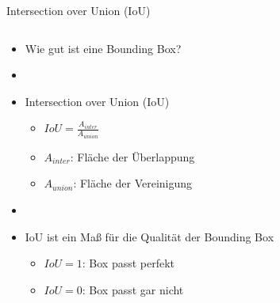 \documentclass{beamer}
\begin{document}
\begin{frame}{Intersection over Union (IoU)}
    \begin{columns}
        \begin{column}{0.6\textwidth}
            \begin{itemize}
                \item Wie gut ist eine Bounding Box?
                \item[]
                \item<2-> Intersection over Union (IoU)
                      \begin{itemize}
                          \item $IoU = \frac{A_{inter}}{A_{union}}$
                          \item $A_{inter}$: Fläche der Überlappung
                          \item $A_{union}$: Fläche der Vereinigung
                      \end{itemize}
                \item<2->[]
                \item<3-> IoU ist ein Maß für die Qualität der Bounding Box
                      \begin{itemize}
                          \item $IoU = 1$: Box passt perfekt
                          \item $IoU = 0$: Box passt gar nicht
                      \end{itemize}
            \end{itemize}
        \end{column}

        \begin{column}{0.4\textwidth}
            \begin{figure}
                \centering
            \end{figure}
        \end{column}
    \end{columns}
\end{frame}
\end{document}
